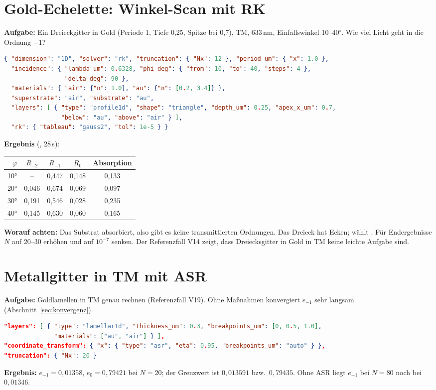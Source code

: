 \section{Gold-Echelette: Winkel-Scan mit RK}
\textbf{Aufgabe:} Ein Dreieckgitter in Gold (Periode 1\um, Tiefe 0,25\um, Spitze bei 0,7\um), TM, 633\,nm,
Einfallswinkel 10--40$^\circ$. Wie viel Licht geht in die Ordnung $-1$?
\begin{lstlisting}[language=json]
{ "dimension": "1D", "solver": "rk", "truncation": { "Nx": 12 }, "period_um": { "x": 1.0 },
  "incidence": { "lambda_um": 0.6328, "phi_deg": { "from": 10, "to": 40, "steps": 4 },
                 "delta_deg": 90 },
  "materials": { "air": {"n": 1.0}, "au": {"n": [0.2, 3.4]} },
  "superstrate": "air", "substrate": "au",
  "layers": [ { "type": "profile1d", "shape": "triangle", "depth_um": 0.25, "apex_x_um": 0.7,
                "below": "au", "above": "air" } ],
  "rk": { "tableau": "gauss2", "tol": 1e-5 } }
\end{lstlisting}
\textbf{Ergebnis} (, 28\,s):
\begin{center}
\small
\begin{tabular}{rcccc}
\toprule
$\varphi$ & $R_{-2}$ & $R_{-1}$ & $R_0$ & Absorption \\
\midrule
10° & -- & 0,447 & 0,148 & 0,133 \\
20° & 0,046 & 0,674 & 0,069 & 0,097 \\
30° & 0,191 & 0,546 & 0,028 & 0,235 \\
40° & 0,145 & 0,630 & 0,060 & 0,165 \\
\bottomrule
\end{tabular}
\end{center}
\textbf{Worauf achten:} Das Substrat absorbiert, also gibt es keine transmittierten Ordnungen. Das Dreieck hat Ecken;
 wählt . Für Endergebnisse $N$ auf 20--30 erhöhen und  auf $10^{-7}$ senken. Der
Referenzfall V14 zeigt, dass Dreiecksgitter in Gold in TM keine leichte Aufgabe sind.

\section{Metallgitter in TM mit ASR}
\textbf{Aufgabe:} Goldlamellen in TM genau rechnen (Referenzfall V19). Ohne Maßnahmen konvergiert $e_{-1}$ sehr
langsam (Abschnitt~\ref{sec:konvergenz}).
\begin{lstlisting}[language=json]
"layers": [ { "type": "lamellar1d", "thickness_um": 0.3, "breakpoints_um": [0, 0.5, 1.0],
              "materials": ["au", "air"] } ],
"coordinate_transform": { "x": { "type": "asr", "eta": 0.95, "breakpoints_um": "auto" } },
"truncation": { "Nx": 20 }
\end{lstlisting}
\textbf{Ergebnis:} $e_{-1}=0{,}01358$, $e_0=0{,}79421$ bei $N=20$; der Grenzwert ist $0{,}013591$ bzw.\ $0{,}79435$.
Ohne ASR liegt $e_{-1}$ bei $N=80$ noch bei $0{,}01346$.

